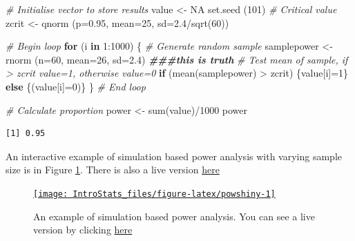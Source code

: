 \documentclass[
  oneside]{krantz}
\newenvironment{Shaded}{\begin{snugshade}}{\end{snugshade}}
\newcommand{\AttributeTok}[1]{\textcolor[rgb]{0.77,0.63,0.00}{#1}}
\newcommand{\CommentTok}[1]{\textcolor[rgb]{0.56,0.35,0.01}{\textit{#1}}}
\newcommand{\ConstantTok}[1]{\textcolor[rgb]{0.00,0.00,0.00}{#1}}
\newcommand{\ControlFlowTok}[1]{\textcolor[rgb]{0.13,0.29,0.53}{\textbf{#1}}}
\newcommand{\DecValTok}[1]{\textcolor[rgb]{0.00,0.00,0.81}{#1}}
\newcommand{\DocumentationTok}[1]{\textcolor[rgb]{0.56,0.35,0.01}{\textbf{\textit{#1}}}}
\newcommand{\FloatTok}[1]{\textcolor[rgb]{0.00,0.00,0.81}{#1}}
\newcommand{\FunctionTok}[1]{\textcolor[rgb]{0.00,0.00,0.00}{#1}}
\newcommand{\NormalTok}[1]{#1}
\newcommand{\OtherTok}[1]{\textcolor[rgb]{0.56,0.35,0.01}{#1}}
\newcommand{\SpecialCharTok}[1]{\textcolor[rgb]{0.00,0.00,0.00}{#1}}
\begin{document}
\begin{Shaded}
\begin{Highlighting}[]
\CommentTok{\# Initialise vector to store results}
\NormalTok{value }\OtherTok{\textless{}{-}} \ConstantTok{NA}
\FunctionTok{set.seed}\NormalTok{ (}\DecValTok{101}\NormalTok{)}
\CommentTok{\# Critical value}
\NormalTok{zcrit }\OtherTok{\textless{}{-}} \FunctionTok{qnorm}\NormalTok{ (}\AttributeTok{p=}\FloatTok{0.95}\NormalTok{, }\AttributeTok{mean=}\DecValTok{25}\NormalTok{, }\AttributeTok{sd=}\FloatTok{2.4}\SpecialCharTok{/}\FunctionTok{sqrt}\NormalTok{(}\DecValTok{60}\NormalTok{))}

\CommentTok{\# Begin loop}
\ControlFlowTok{for}\NormalTok{ (i }\ControlFlowTok{in} \DecValTok{1}\SpecialCharTok{:}\DecValTok{1000}\NormalTok{) \{}
  \CommentTok{\# Generate random sample}
\NormalTok{  samplepower }\OtherTok{\textless{}{-}} \FunctionTok{rnorm}\NormalTok{ (}\AttributeTok{n=}\DecValTok{60}\NormalTok{, }\AttributeTok{mean=}\DecValTok{26}\NormalTok{, }\AttributeTok{sd=}\FloatTok{2.4}\NormalTok{) }\DocumentationTok{\#\#\#this is truth}
  \CommentTok{\# Test mean of sample, if \textgreater{} zcrit value=1, otherwise value=0}
  \ControlFlowTok{if}\NormalTok{ (}\FunctionTok{mean}\NormalTok{(samplepower) }\SpecialCharTok{\textgreater{}}\NormalTok{ zcrit) \{value[i]}\OtherTok{=}\DecValTok{1}\NormalTok{\}}
  \ControlFlowTok{else}\NormalTok{ \{(value[i]}\OtherTok{=}\DecValTok{0}\NormalTok{)\}}
\NormalTok{\} }\CommentTok{\# End loop}

\CommentTok{\# Calculate proportion}
\NormalTok{power }\OtherTok{\textless{}{-}} \FunctionTok{sum}\NormalTok{(value)}\SpecialCharTok{/}\DecValTok{1000}
\NormalTok{power}
\end{Highlighting}
\end{Shaded}

\begin{verbatim}
[1] 0.95
\end{verbatim}

An interactive example of simulation based power analysis with varying sample size is in Figure \ref{fig:powshiny}. There is also a live version \href{https://moniquemackenzie.shinyapps.io/IntroStats_PowerDemo/}{here}



\begin{figure}

{\centering \href{https://moniquemackenzie.shinyapps.io/IntroStats_PowerDemo/}{\texttt{[image: IntroStats\_files/figure-latex/powshiny-1]} }

}

\caption{An example of simulation based power analysis. You can see a live version by clicking \href{https://moniquemackenzie.shinyapps.io/IntroStats_PowerDemo/}{here}}\label{fig:powshiny}
\end{figure}
\end{document}
